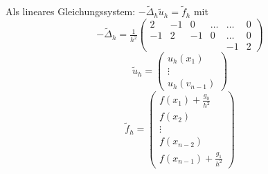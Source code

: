 \documentclass{cheat-sheet}
\newcommand{\Laplace}{\Delta}
\begin{document}
\begin{alg}
\begin{enumerate}
    Als lineares Gleichungssystem: $- \tilde{\Laplace}_h \tilde{u}_h = \tilde{f}_h$ mit
    \[
      - \tilde{\Laplace}_h = \tfrac{1}{h^2} \begin{pmatrix}
        2 & -1 & 0 & \ldots & \ldots & 0 \\
        -1 & 2 & -1 & 0 & \ldots & 0 \\
        &&&& -1 & 2
      \end{pmatrix}
    \]
    \[
      \tilde{u}_h = \begin{pmatrix}
        u_h(x_1) \\ \vdots \\ u_h(v_{n-1})
      \end{pmatrix}
    \]
    \[
      \tilde{f}_h = \begin{pmatrix}
        f(x_1) + \tfrac{g_0}{h^2} \\
        f(x_2) \\
        \vdots \\
        f(x_{n-2}) \\
        f(x_{n-1}) + \tfrac{g_1}{h^2}
      \end{pmatrix}
    \]
  \end{enumerate}
\end{alg}
\end{document}
